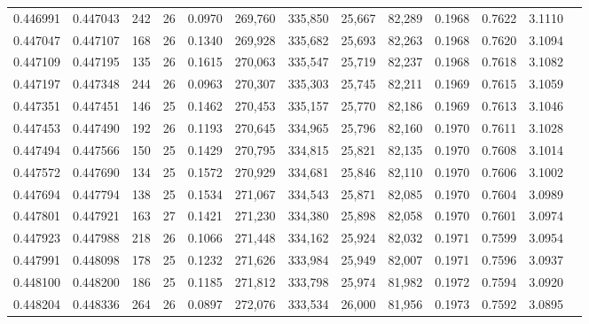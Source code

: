 \begin{tabular}{rrrrrrrrrrrrr}
0.446991 & 0.447043 & 242 &  26 &                                     0.0970 & 269,760 & 335,850 &  25,667 &  82,289 & 0.1968 & 0.7622 & 3.1110 \\
0.447047 & 0.447107 & 168 &  26 &                                     0.1340 & 269,928 & 335,682 &  25,693 &  82,263 & 0.1968 & 0.7620 & 3.1094 \\
0.447109 & 0.447195 & 135 &  26 &                                     0.1615 & 270,063 & 335,547 &  25,719 &  82,237 & 0.1968 & 0.7618 & 3.1082 \\
0.447197 & 0.447348 & 244 &  26 &                                     0.0963 & 270,307 & 335,303 &  25,745 &  82,211 & 0.1969 & 0.7615 & 3.1059 \\
0.447351 & 0.447451 & 146 &  25 &                                     0.1462 & 270,453 & 335,157 &  25,770 &  82,186 & 0.1969 & 0.7613 & 3.1046 \\
0.447453 & 0.447490 & 192 &  26 &                                     0.1193 & 270,645 & 334,965 &  25,796 &  82,160 & 0.1970 & 0.7611 & 3.1028 \\
0.447494 & 0.447566 & 150 &  25 &                                     0.1429 & 270,795 & 334,815 &  25,821 &  82,135 & 0.1970 & 0.7608 & 3.1014 \\
0.447572 & 0.447690 & 134 &  25 &                                     0.1572 & 270,929 & 334,681 &  25,846 &  82,110 & 0.1970 & 0.7606 & 3.1002 \\
0.447694 & 0.447794 & 138 &  25 &                                     0.1534 & 271,067 & 334,543 &  25,871 &  82,085 & 0.1970 & 0.7604 & 3.0989 \\
0.447801 & 0.447921 & 163 &  27 &                                     0.1421 & 271,230 & 334,380 &  25,898 &  82,058 & 0.1970 & 0.7601 & 3.0974 \\
0.447923 & 0.447988 & 218 &  26 &                                     0.1066 & 271,448 & 334,162 &  25,924 &  82,032 & 0.1971 & 0.7599 & 3.0954 \\
0.447991 & 0.448098 & 178 &  25 &                                     0.1232 & 271,626 & 333,984 &  25,949 &  82,007 & 0.1971 & 0.7596 & 3.0937 \\
0.448100 & 0.448200 & 186 &  25 &                                     0.1185 & 271,812 & 333,798 &  25,974 &  81,982 & 0.1972 & 0.7594 & 3.0920 \\
0.448204 & 0.448336 & 264 &  26 &                                     0.0897 & 272,076 & 333,534 &  26,000 &  81,956 & 0.1973 & 0.7592 & 3.0895 \\

\end{tabular}
